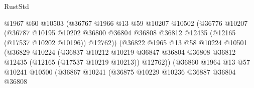\begin{lexlean}{RustStd}
\begin{coremodule}
                                    @1967
                                    @60
                                    @10503
                                    (@36767
                                      @1966
                                      @13
                                      @59
                                      @10207
                                      @10502
                                      (@36776
                                        @10207
                                        (@36787
                                          @10195
                                          @10202
                                          @36800
                                          @36804
                                          @36808
                                          @36812
                                          @12435
                                          (@12165 (@17537 @10202 @10196))
                                          @12762))
                                      (@36822
                                        @1965
                                        @13
                                        @58
                                        @10224
                                        @10501
                                        (@36829
                                          @10224
                                          (@36837
                                            @10212
                                            @10219
                                            @36847
                                            @36804
                                            @36808
                                            @36812
                                            @12435
                                            (@12165 (@17537 @10219 @10213))
                                            @12762))
                                        (@36860
                                          @1964
                                          @13
                                          @57
                                          @10241
                                          @10500
                                          (@36867
                                            @10241
                                            (@36875
                                              @10229
                                              @10236
                                              @36887
                                              @36804
                                              @36808

\end{coremodule}
\end{lexlean}
